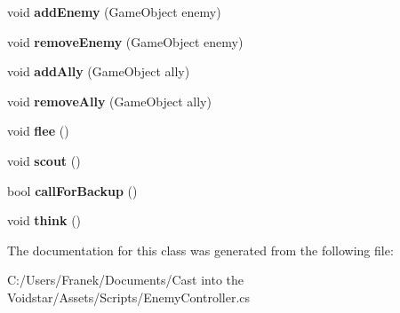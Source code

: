 \begin{DoxyCompactItemize}
\item 
\hypertarget{class_enemy_controller_1_1_agent_ad2e67bdc0957aa906a427e7b385a1bb6}{}void {\bfseries add\+Enemy} (Game\+Object enemy)\label{class_enemy_controller_1_1_agent_ad2e67bdc0957aa906a427e7b385a1bb6}

\item 
\hypertarget{class_enemy_controller_1_1_agent_af2e214b9a964b8277c4f97ff9c762251}{}void {\bfseries remove\+Enemy} (Game\+Object enemy)\label{class_enemy_controller_1_1_agent_af2e214b9a964b8277c4f97ff9c762251}

\item 
\hypertarget{class_enemy_controller_1_1_agent_a16c99220f5df752bd3bbedaa0188418e}{}void {\bfseries add\+Ally} (Game\+Object ally)\label{class_enemy_controller_1_1_agent_a16c99220f5df752bd3bbedaa0188418e}

\item 
\hypertarget{class_enemy_controller_1_1_agent_acd0813f8ea5ba116c5cb700e4dc1004f}{}void {\bfseries remove\+Ally} (Game\+Object ally)\label{class_enemy_controller_1_1_agent_acd0813f8ea5ba116c5cb700e4dc1004f}

\item 
\hypertarget{class_enemy_controller_1_1_agent_ad41969970fdcfc56ddd475c0ceea04bb}{}void {\bfseries flee} ()\label{class_enemy_controller_1_1_agent_ad41969970fdcfc56ddd475c0ceea04bb}

\item 
\hypertarget{class_enemy_controller_1_1_agent_a5c50a2432bf00a04e1365758d7182ee1}{}void {\bfseries scout} ()\label{class_enemy_controller_1_1_agent_a5c50a2432bf00a04e1365758d7182ee1}

\item 
\hypertarget{class_enemy_controller_1_1_agent_ad54d26eeeac1c75cf491c50765da9c97}{}bool {\bfseries call\+For\+Backup} ()\label{class_enemy_controller_1_1_agent_ad54d26eeeac1c75cf491c50765da9c97}

\item 
\hypertarget{class_enemy_controller_1_1_agent_a1d0126f3f76ef35fd0fe91a2e976af8f}{}void {\bfseries think} ()\label{class_enemy_controller_1_1_agent_a1d0126f3f76ef35fd0fe91a2e976af8f}

\end{DoxyCompactItemize}


The documentation for this class was generated from the following file\+:\begin{DoxyCompactItemize}
\item 
C\+:/\+Users/\+Franek/\+Documents/\+Cast into the Voidstar/\+Assets/\+Scripts/Enemy\+Controller.\+cs\end{DoxyCompactItemize}
